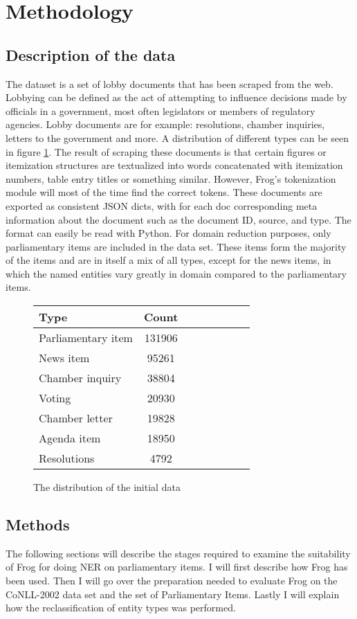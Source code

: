\section{Methodology}
\label{sec:meth}


\subsection{Description of the data}
The dataset is a set of lobby documents that has been scraped from the web. Lobbying can be defined as the act of attempting to influence decisions made by officials in a government, most often legislators or members of regulatory agencies. Lobby documents are for example: resolutions, chamber inquiries, letters to the government and more. A distribution of different types can be seen in figure \ref{fig:data_dis}. The result of scraping these documents is that certain figures or itemization structures are textualized into words concatenated with itemization numbers, table entry titles or something similar. However, Frog's tokenization module will most of the time find the correct tokens.  These documents are exported as consistent JSON dicts, with for each doc corresponding meta information about the document such as the document ID, source, and type. The format can easily be read with Python. For domain reduction purposes, only parliamentary items are included in the data set. These items form the majority of the items and are in itself a mix of all types, except for the news items, in which the named entities vary greatly in domain compared to the parliamentary items.

\begin{figure} \label{fig:data_dis}
\centering
\begin{tabular}{l*{6}{c}r}
Type              & Count \\
\hline
Parliamentary item & 131906  \\
News item & 95261 \\
Chamber inquiry & 38804  \\
Voting & 20930 \\
Chamber letter & 19828 \\
Agenda item & 18950  \\
Resolutions & 4792 \\
\end{tabular}
\caption{The distribution of the initial data}
\end{figure}

\subsection{Methods}
The following sections will describe the stages required to examine the suitability of Frog for doing NER on parliamentary items. I will first describe how Frog has been used. Then I will go over the preparation needed to evaluate Frog on the CoNLL-2002 data set and the set of Parliamentary Items. Lastly I will explain how the reclassification of entity types was performed. 

